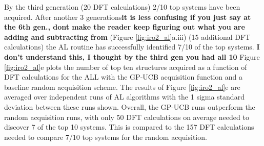 %
By the third generation (\num{20} DFT calculations) \num{2/10} top systems have been acquired.
%
After another \num{3} generations\textbf{it is less confusing if you just say at the 6th gen., dont make the reader keep figuring out what you are adding and subtracting from} (Figure \ref{fig:iro2_al}a.iii) (\num{15} additional DFT calculations) the AL routine has successfully identified \num{7/10} of the top systems. \textbf{I don't understand this, I thought by the third gen you had all 10}
%
Figure \ref{fig:iro2_al}e plots the number of top ten structures acquired as a function of DFT calculations for the ALL with the GP-UCB acquisition function and a baseline random acquisition scheme.
%
The results of Figure \ref{fig:iro2_al}e are averaged over independent runs of AL algorithms with the 1 sigma standard deviation between these runs shown.
%
Overall, the GP-UCB runs outperform the random acquisition runs, with only \num{50} DFT calculations on average needed to discover \num{7} of the top \num{10} systems.
%
This is compared to the \num{157} DFT calculations needed to compare \num{7/10} top systems for the random acquisition.


